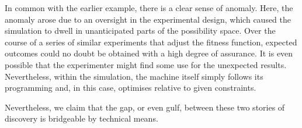 In common with the earlier example, there is a clear sense of anomaly.  Here, the anomaly arose due to an oversight in the experimental design, which caused the simulation to dwell in unanticipated parts of the possibility space. Over the course of a series of similar experiments that adjust the fitness function, expected outcomes could no doubt be obtained with a high degree of assurance. It is even possible that the experimenter might find some use for the unexpected results. Nevertheless, within the simulation, the machine itself simply follows its programming and, in this case, optimises relative to given constraints.

Nevertheless, we claim that the gap, or even gulf, between these two stories of discovery is bridgeable by technical means. 


\begin{comment}
\citeA{van1994anatomy} -- echoing the
(negative) reflections on the potential
for a purely computational approach to mathematics from \citeA{poincare1910creation} -- claimed that:
\begin{quote}
``\emph{Like all intuitive operating, pure serendipity is not amenable
    to generation by a computer.  The very moment I can plan or
    programme `serendipity' it cannot be called serendipity
    anymore}.'' \cite[p.~646]{van1994anatomy}
\end{quote}
We believe that serendipity is not so mystical as such statements
might seem to imply.  In Section \ref{sec:discussion} we will show
that ``patterns of serendipity'' like those collected by van Andel can
be applied in the design of computational systems.  Purposive acts can
have unintended consequences \cite{merton1936unanticipated}.
Similarly, even if we cannot plan or program serendipity, we can
prepare for it.


\end{comment}
